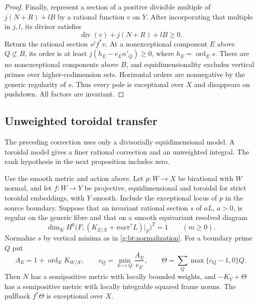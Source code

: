 \begin{proof}
Finally, represent a section of a positive divisible multiple of
$j(N+R)+lB$ by a rational function $v$ on $Y$. After incorporating
that multiple in $j,l$, its divisor satisfies
\[
             \operatorname{div}(v)+j(N+R)+lB\geq0.
\]
Return the rational section $s^jf^*v$. At a nonexceptional component
$E$ above $Q\not\subset B$, its order is at least
$j(h_E-e_En'_Q)\geq0$, where $h_E=\operatorname{ord}_Es$.
There are no nonexceptional components above $B$, and
equidimensionality excludes vertical primes over higher-codimension
sets. Horizontal orders are nonnegative by the generic regularity of
$s$. Thus every pole is exceptional over $X$ and disappears on
pushdown. All factors are invariant.
\end{proof}

\subsection{Unweighted toroidal transfer}
\label{g:bt:toroidal}

The preceding correction uses only a divisorially equidimensional model.
A toroidal model gives a finer rational correction and an unweighted
integral.  The rank hypothesis in the next proposition includes zero.

\begin{proposition}
\label{g:bt:toroidal-transfer}
Use the smooth metric and action above.  Let $p:W\to X$ be birational
with $W$ normal, and let $f:W\to Y$ be projective, equidimensional and
toroidal for strict toroidal embeddings, with $Y$ smooth.  Include the
exceptional locus of $p$ in the source boundary.  Suppose that an
invariant rational section $s$ of $aL$, $a>0$, is regular on the generic
fibre and that on a smooth equivariant resolved diagram
\begin{equation}\label{g:bt:zeroth-rank}
 \dim_K H^0\bigl(F,(K_{Z/X}+ma\pi^*L)|_F\bigr)^T=1
                           \qquad(m\geq0).
\end{equation}
Normalize $s$ by vertical minima as in \eqref{g:bt:normalization}.
For a boundary prime $Q$ put
\[
 A_E=1+\operatorname{ord}_E K_{W/X},\qquad
 c_Q=\min_{E\mapsto Q}\frac{A_E}{e_E},\qquad
 \Theta=\sum_Q\max\{c_Q-1,0\}Q.
\]
Then $N$ has a semipositive metric with locally bounded weights, and
$-K_Y+\Theta$ has a semipositive metric with locally integrable squared
frame norms.  The pullback $f^*\Theta$ is exceptional over $X$.
\end{proposition}

